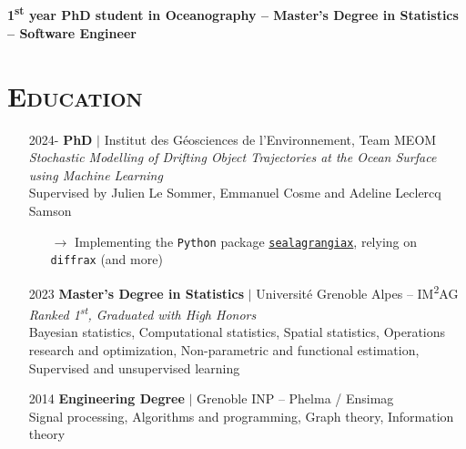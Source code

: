 \documentclass{article}
\begin{document}
\\[.1 cm]

\begin{center}
    \large{\textbf{1\textsuperscript{st} year PhD student in Oceanography – Master's Degree in Statistics – Software Engineer}}
\end{center}

\section*{\textsc{Education}}
\begin{itemize}
    \item[] 2024- \tabto{2cm} \textbf{PhD} $\vert$ Institut des Géosciences de l'Environnement, Team MEOM \\[.1 cm]
    \tabto{2cm} \textit{Stochastic Modelling of Drifting Object Trajectories at the Ocean Surface using Machine Learning} \\[.1 cm]
    \tabto{2cm} Supervised by Julien Le Sommer, Emmanuel Cosme and Adeline Leclercq Samson
    \vspace{-.1 cm}
    \begin{itemize}[left=2cm]
        \item[$\rightarrow$] Implementing the \texttt{Python} package \href{https://gitfront.io/r/vadmbertr/9qHVDfXFk3pZ/sealagrangiax/}{\texttt{sealagrangiax}}, relying on \texttt{diffrax} (and more)
    \end{itemize}
    \item[] 2023 \tabto{2cm} \textbf{Master’s Degree in Statistics} $\vert$ Université Grenoble Alpes – IM\textsuperscript{2}AG \\[.15 cm]
    \tabto{2cm} \textit{Ranked 1\textsuperscript{st}, Graduated with High Honors} \\[.1 cm]
    \tabto{2cm} Bayesian statistics, Computational statistics, Spatial statistics, Operations research and optimization, \tabto{2cm} Non-parametric and functional estimation, Supervised and unsupervised learning
    \item[] 2014 \tabto{2cm} \textbf{Engineering Degree} $\vert$ Grenoble INP – Phelma / Ensimag \\[.1 cm]
    \tabto{2cm} Signal processing, Algorithms and programming, Graph theory, Information theory
\end{itemize}
\end{document}
